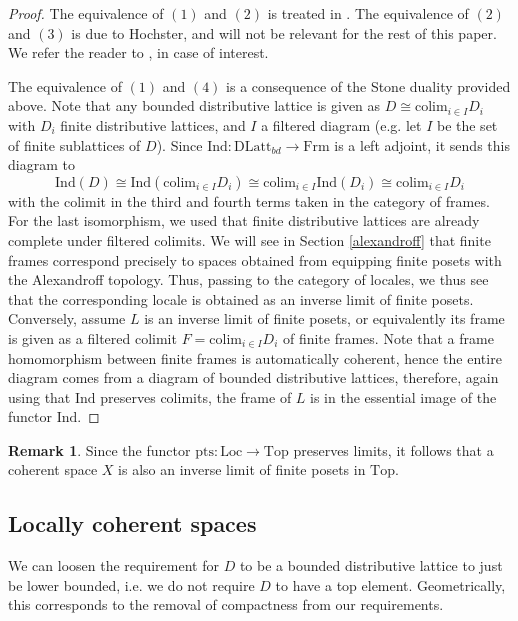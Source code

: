 \documentclass[10pt]{amsart}
\theoremstyle{definition}
\newtheorem{remark}[theorem]{Remark}
\newcommand{\colim}{\text{colim}}
\begin{document}
\begin{proof} The equivalence of $(1)$ and $(2)$ is treated in \cite[p. 65ff]{johnstone1982stone}. The equivalence of $(2)$ and $(3)$ is due to Hochster, and will not be relevant for the rest of this paper. We refer the reader to \cite[Section 12.6]{Dickmann_Schwartz_Tressl_2019}, in case of interest.

The equivalence of $(1)$ and $(4)$ is a consequence of the Stone duality provided above. Note that any bounded distributive lattice is given as $D \cong \colim_{i \in I} D_i$ with $D_i$ finite distributive lattices, and $I$ a filtered diagram (e.g. let $I$ be the set of finite sublattices of $D$). Since $\mathrm{Ind} : \mathrm{DLatt}_{bd} \rightarrow \mathrm{Frm}$ is a left adjoint, it sends this diagram to
$$ \mathrm{Ind}(D) \cong \mathrm{Ind}( \colim_{i \in I} D_i ) \cong \colim_{i \in I} \mathrm{Ind}(D_i) \cong \colim_{i \in I} D_i$$
with the colimit in the third and fourth terms taken in the category of frames. For the last isomorphism, we used that finite distributive lattices are already complete under filtered colimits. We will see in Section \ref{alexandroff} that finite frames correspond precisely to spaces obtained from equipping finite posets with the Alexandroff topology. Thus, passing to the category of locales, we thus see that the corresponding locale is obtained as an inverse limit of finite posets. Conversely, assume  $L$ is an inverse limit of finite posets, or equivalently its frame is given as a filtered colimit $F = \colim_{i \in I} D_i$ of finite frames. Note that a frame homomorphism between finite frames is automatically coherent, hence the entire diagram comes from a diagram of bounded distributive lattices, therefore, again using that $\mathrm{Ind}$ preserves colimits, the frame of $L$ is in the essential image of the functor $\mathrm{Ind}$. \end{proof}

\begin{remark}
Since the functor $\mathrm{pts}: \mathrm{Loc} \rightarrow \mathrm{Top}$ preserves limits, it follows that a coherent space $X$ is also an inverse limit of finite posets in $\mathrm{Top}$.
\end{remark}


\subsection{Locally coherent spaces}

We can loosen the requirement for $D$ to be a bounded distributive lattice to just be lower bounded, i.e. we do not require $D$ to have a top element. Geometrically, this corresponds to the removal of compactness from our requirements.
\end{document}
